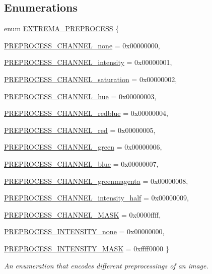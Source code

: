 \subsection*{Enumerations}
\begin{CompactItemize}
\item 
enum \hyperlink{namespaceextrema_837b46455687e9080322d02a03574dab}{EXTREMA\_\-PREPROCESS} \{ \par
\hyperlink{namespaceextrema_837b46455687e9080322d02a03574dab6e6905a3051cdbd1851efe84003767c9}{PREPROCESS\_\-CHANNEL\_\-none} =  0x00000000, 
\par
\hyperlink{namespaceextrema_837b46455687e9080322d02a03574dab5ff7df8d9fc7be7fd6275ad131a44f63}{PREPROCESS\_\-CHANNEL\_\-intensity} =  0x00000001, 
\par
\hyperlink{namespaceextrema_837b46455687e9080322d02a03574dabadc1adf81839246189e2101136e4803a}{PREPROCESS\_\-CHANNEL\_\-saturation} =  0x00000002, 
\par
\hyperlink{namespaceextrema_837b46455687e9080322d02a03574dab7d8fd3f696403b8d3a06ace8042f109a}{PREPROCESS\_\-CHANNEL\_\-hue} =  0x00000003, 
\par
\hyperlink{namespaceextrema_837b46455687e9080322d02a03574dab816f4249ff73dc421ade287c4aefe7c9}{PREPROCESS\_\-CHANNEL\_\-redblue} =  0x00000004, 
\par
\hyperlink{namespaceextrema_837b46455687e9080322d02a03574dab979894d180cfe39ba533c1783e4b54aa}{PREPROCESS\_\-CHANNEL\_\-red} =  0x00000005, 
\par
\hyperlink{namespaceextrema_837b46455687e9080322d02a03574dab02b2121aec79fe04eca1c07da6e3f736}{PREPROCESS\_\-CHANNEL\_\-green} =  0x00000006, 
\par
\hyperlink{namespaceextrema_837b46455687e9080322d02a03574dab15a04c3a540efeb8a7c66ce5ef57f0e6}{PREPROCESS\_\-CHANNEL\_\-blue} =  0x00000007, 
\par
\hyperlink{namespaceextrema_837b46455687e9080322d02a03574dab8fce3b44ce4243329cdeac24901c9eb4}{PREPROCESS\_\-CHANNEL\_\-greenmagenta} =  0x00000008, 
\par
\hyperlink{namespaceextrema_837b46455687e9080322d02a03574daba06e033c2799b1aa4b3f0c443d92761e}{PREPROCESS\_\-CHANNEL\_\-intensity\_\-half} =  0x00000009, 
\par
\hyperlink{namespaceextrema_837b46455687e9080322d02a03574dab012fc30ad1d9748fb9b87f9fd0e7ae66}{PREPROCESS\_\-CHANNEL\_\-MASK} =  0x0000ffff, 
\par
\hyperlink{namespaceextrema_837b46455687e9080322d02a03574dab87840119e4ff8124647a53f61ee7b40d}{PREPROCESS\_\-INTENSITY\_\-none} =  0x00000000, 
\par
\hyperlink{namespaceextrema_837b46455687e9080322d02a03574dab13d197e4e739d54780467b0c74d12c32}{PREPROCESS\_\-INTENSITY\_\-MASK} =  0xffff0000
 \}
\begin{CompactList}\small\item\em An enumeration that encodes different preprocessings of an image. \item\end{CompactList}\end{CompactItemize}

